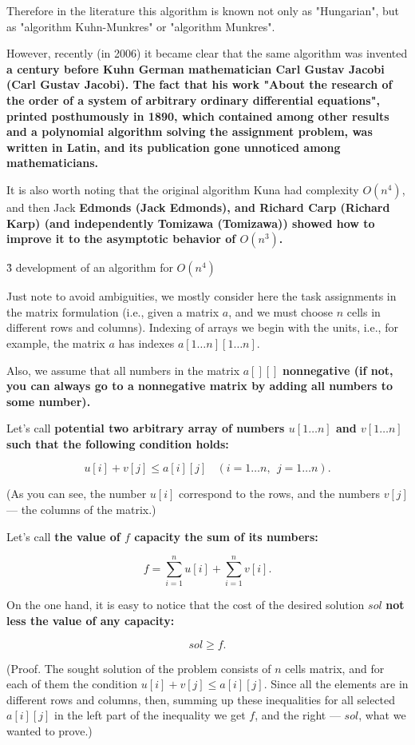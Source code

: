 Therefore in the literature this algorithm is known not only as "Hungarian", but as "algorithm Kuhn-Munkres" or "algorithm Munkres".

However, recently (in 2006) it became clear that the same algorithm was invented \bf{a century before Kuhn} German mathematician Carl Gustav \bf{Jacobi} (Carl Gustav Jacobi). The fact that his work "About the research of the order of a system of arbitrary ordinary differential equations", printed posthumously in 1890, which contained among other results and a polynomial algorithm solving the assignment problem, was written in Latin, and its publication \bf{gone unnoticed} among mathematicians.

It is also worth noting that the original algorithm Kuna had complexity $O(n^4)$, and then Jack \bf{Edmonds} (Jack Edmonds), and Richard \bf{Carp} (Richard Karp) (and independently \bf{Tomizawa} (Tomizawa)) showed how to improve it to the asymptotic behavior of $O(n^3)$.


\h3{ development of an algorithm for $O(n^4)$ }

Just note to avoid ambiguities, we mostly consider here the task assignments in the matrix formulation (i.e., given a matrix $a$, and we must choose $n$ cells in different rows and columns). Indexing of arrays we begin with the units, i.e., for example, the matrix $a$ has indexes $a[1 \ldots n][1 \ldots n]$.

Also, we assume that all numbers in the matrix $a[][]$ \bf{nonnegative} (if not, you can always go to a nonnegative matrix by adding all numbers to some number).

Let's call \bf{potential} two arbitrary array of numbers $u[1 \ldots n]$ and $v[1 \ldots n]$ such that the following condition holds:

$$ u[i] + v[j] \le a[i][j] ~~~~ (i = 1 \ldots n, ~~ j = 1 \ldots n). $$

(As you can see, the number $u[i]$ correspond to the rows, and the numbers $v[j]$ --- the columns of the matrix.)

Let's call \bf{the value of $f$ capacity} the sum of its numbers:

$$ f = \sum_{i=1}^n u[i] + \sum_{i=1}^n v[i]. $$

On the one hand, it is easy to notice that the cost of the desired solution $sol$ \bf{not less} the value of any capacity:

$$ sol \ge f. $$

(Proof. The sought solution of the problem consists of $n$ cells matrix, and for each of them the condition $u[i] + v[j] \le a[i][j]$. Since all the elements are in different rows and columns, then, summing up these inequalities for all selected $a[i][j]$ in the left part of the inequality we get $f$, and the right --- $sol$, what we wanted to prove.)

